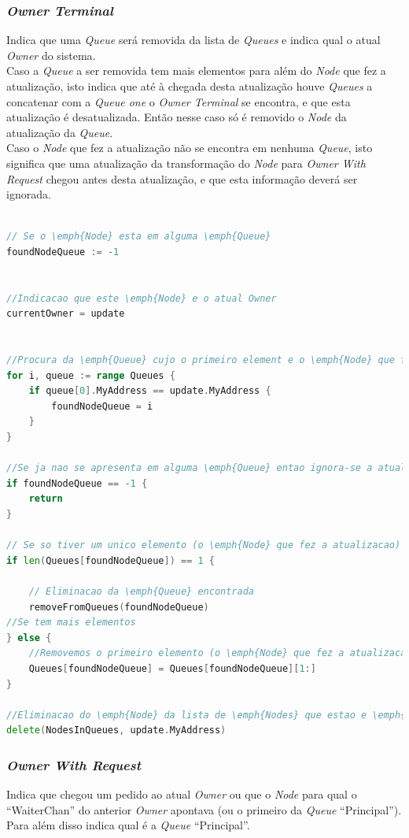 \subsubsection*{\emph{Owner Terminal}}
Indica que uma \emph{Queue} será removida da lista de \emph{Queues} e indica qual o atual \emph{Owner} do sistema.\\
Caso a \emph{Queue} a ser removida tem mais elementos para além do \emph{Node} que fez a atualização, isto indica que até à chegada desta atualização houve \emph{Queues} a concatenar com a \emph{Queue one} o \emph{Owner Terminal} se encontra, e que esta atualização é desatualizada. Então nesse caso só é removido o \emph{Node} da atualização da \emph{Queue}.\\
Caso o \emph{Node} que fez a atualização não se encontra em nenhuma \emph{Queue}, isto significa que uma atualização da transformação do \emph{Node} para \emph{Owner With Request} chegou antes desta atualização, e que esta informação deverá ser ignorada.

\begin{lstlisting}[caption={Alterações nas filas caso o \emph{Node} seja do tipo ``Owner Terminal''},language=Go]

// Se o \emph{Node} esta em alguma \emph{Queue}
foundNodeQueue := -1


//Indicacao que este \emph{Node} e o atual Owner
currentOwner = update


//Procura da \emph{Queue} cujo o primeiro element e o \emph{Node} que fez a atualizacao
for i, queue := range Queues {
	if queue[0].MyAddress == update.MyAddress {
		foundNodeQueue = i
	}
}

//Se ja nao se apresenta em alguma \emph{Queue} entao ignora-se a atualizacao
if foundNodeQueue == -1 {
	return
}

// Se so tiver um unico elemento (o \emph{Node} que fez a atualizacao) 
if len(Queues[foundNodeQueue]) == 1 {

	// Eliminacao da \emph{Queue} encontrada
	removeFromQueues(foundNodeQueue)
//Se tem mais elementos
} else {
	//Removemos o primeiro elemento (o \emph{Node} que fez a atualizacao)
	Queues[foundNodeQueue] = Queues[foundNodeQueue][1:]
}

//Eliminacao do \emph{Node} da lista de \emph{Nodes} que estao e \emph{Queues}
delete(NodesInQueues, update.MyAddress)


\end{lstlisting}


\subsubsection*{\emph{Owner With Request}}
Indica que chegou um pedido ao atual \emph{Owner} ou que o \emph{Node} para qual o ``WaiterChan'' do anterior \emph{Owner} apontava (ou o primeiro da \emph{Queue} ``Principal'').
Para além disso indica qual é a \emph{Queue} ``Principal''.

